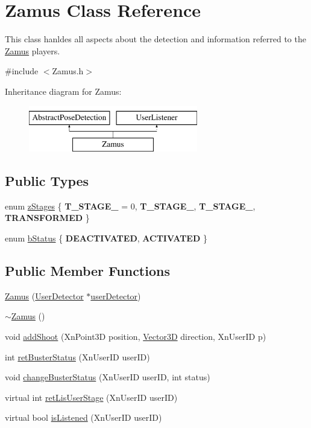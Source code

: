 \hypertarget{classZamus}{
\section{Zamus Class Reference}
\label{classZamus}
}


This class hanldes all aspects about the detection and information referred to the \hyperlink{classZamus}{Zamus} players.  




{\ttfamily \#include $<$Zamus.h$>$}

Inheritance diagram for Zamus:\begin{figure}[H]
\begin{center}
\leavevmode
\includegraphics[height=2cm]{classZamus}
\end{center}
\end{figure}
\subsection*{Public Types}
\begin{DoxyCompactItemize}
\item 
enum \hyperlink{classZamus_a96d3e36d702b18721c5a600374b719d4}{zStages} \{ {\bfseries T\_\-STAGE\_} =  0, 
{\bfseries T\_\-STAGE\_}, 
{\bfseries T\_\-STAGE\_}, 
{\bfseries TRANSFORMED}
 \}
\item 
enum \hyperlink{classZamus_a526a54006da10b674ba8f8f6f2e1babc}{bStatus} \{ {\bfseries DEACTIVATED}, 
{\bfseries ACTIVATED}
 \}
\end{DoxyCompactItemize}
\subsection*{Public Member Functions}
\begin{DoxyCompactItemize}
\item 
\hyperlink{classZamus_aeacafafa18573498933213b913c335bd}{Zamus} (\hyperlink{classUserDetector}{UserDetector} $\ast$\hyperlink{classAbstractPoseDetection_a20dccd0d1494d1ef0ec896e996b5e70b}{userDetector})
\item 
\hyperlink{classZamus_a0f7b461022280659da44d83157c6572f}{$\sim$Zamus} ()
\item 
void \hyperlink{classZamus_a2b78080cf5fa4896c66c7bbdb1d4df90}{addShoot} (XnPoint3D position, \hyperlink{classVector3D}{Vector3D} direction, XnUserID p)
\item 
int \hyperlink{classZamus_ae2823178fa5fa30ddfa22e3b3ebd2332}{retBusterStatus} (XnUserID userID)
\item 
void \hyperlink{classZamus_ac7edda8c30064bfafd67351f40ca4a5d}{changeBusterStatus} (XnUserID userID, int status)
\item 
virtual int \hyperlink{classZamus_a727befa3608295027c9db889af9556c1}{retLisUserStage} (XnUserID userID)
\item 
virtual bool \hyperlink{classZamus_ab76c23d1189599fd0cbbce9352b4faeb}{isListened} (XnUserID userID)
\end{DoxyCompactItemize}
